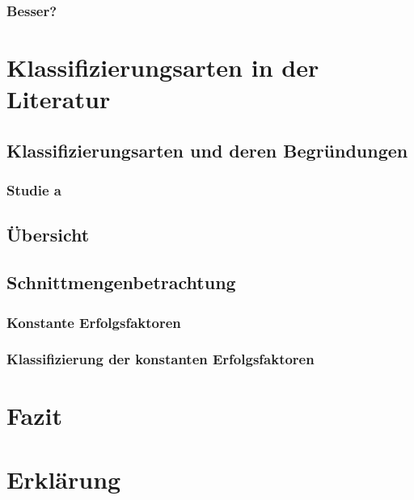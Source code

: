 \documentclass[12pt,a4paper,oneside]{article}
\newcommand{\EF}{Erfolgsfaktoren }
\begin{document}
\subsubsection{Besser?}


\clearpage
\section{Klassifizierungsarten in der Literatur}
\subsection{Klassifizierungsarten und deren Begründungen}
\subsubsection{Studie a}

\subsection{Übersicht}

\subsection{Schnittmengenbetrachtung}
\subsubsection{Konstante \EF}
\subsubsection{Klassifizierung der konstanten \EF}

\section{Fazit}

\clearpage
{}
{}
\printbibliography[title=Literaturverzeichnis]

\clearpage
{}
{}
\section*{Erklärung}

\end{document}
